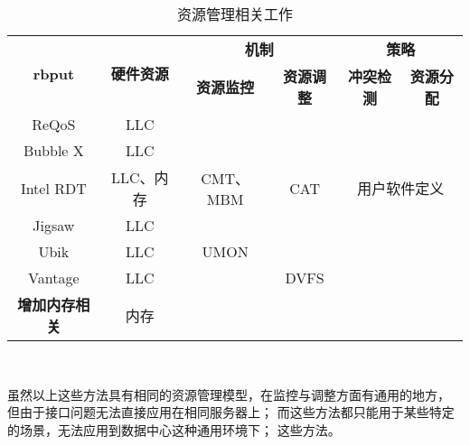 \begin{table}[htb]
  \centering
  \begin{minipage}[t]{0.95\linewidth}
  \caption{资源管理相关工作}
  \label{tab:resman-compare}
    \begin{tabular*}{\linewidth}{cccccc}
      \toprule[1.5pt]
      \multirow{2}{*}{\textbf{rbput}}     & \multirow{2}{*}{\textbf{硬件资源}} & \multicolumn{2}{c}{\textbf{机制}}     & \multicolumn{2}{c}{\textbf{策略}}     \\
                                          &                                    & \textbf{资源监控} & \textbf{资源调整} & \textbf{冲突检测} & \textbf{资源分配} \\
      \midrule[1pt]
      ReQoS\cite{tang_reqos:_2013}        & LLC                                &                   &                   &                   &                   \\
      Bubble X\cite{mars_bubble-up:_2011,yang_bubble-flux:_2013} & LLC                                &                   &                   &                   &                   \\
      \hline
      Intel RDT\cite{intel-rdt}           & LLC、内存                          & CMT、MBM          & CAT               & \multicolumn{2}{c}{用户软件定义}      \\
      Jigsaw\cite{Jigsaw:2013}            & LLC                                &                   &                   &                   &                   \\
      Ubik\cite{kasture_ubik:_2014}       & LLC                                & UMON              &                   &                   &                   \\
      Vantage\cite{sanchez_vantage:_2011} & LLC                                &                   & DVFS              &                   &                   \\
      \hline
      \textbf{增加内存相关}\cite{}        & 内存                               &                   &                   &                   &                   \\
      \bottomrule[1.5pt]
    \end{tabular*}\\[2pt]
  \end{minipage}
\end{table}

虽然以上这些方法具有相同的资源管理模型，在监控与调整方面有通用的地方，
但由于接口问题无法直接应用在相同服务器上；
而这些方法都只能用于某些特定的场景，无法应用到数据中心这种通用环境下；
这些方法。

